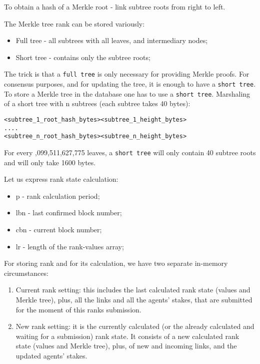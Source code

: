 \documentclass[8pt,oneside]{amsart}
\newcommand{\code}[1]{{\PlayBold #1}}
\begin{document}
\begin{Abstract}
To obtain a hash of a Merkle root - link subtree roots from right to left.

The Merkle tree rank can be stored variously:

\begin{itemize}
\item[] Full tree - all subtrees with all leaves, and intermediary nodes;
\item[] Short tree - contains only the subtree roots;
\end{itemize}

The trick is that a \verb|full tree| is only necessary for providing Merkle proofs. For consensus purposes, and for updating the tree, it is enough to have a \verb|short tree|. To store a Merkle tree in the database one has to use a \verb|short tree|. Marshaling of a short tree with \code{n} subtrees (each subtree takes 40 bytes):

\begin{lstlisting}
<subtree_1_root_hash_bytes><subtree_1_height_bytes>
....
<subtree_n_root_hash_bytes><subtree_n_height_bytes>
\end{lstlisting}

For every \code{1,099,511,627,775} leaves, a \verb|short tree| will only contain 40 subtree roots and will only take 1600 bytes.

Let us express rank state calculation:

\begin{itemize}
    \item[] \code{p} - rank calculation period;
    \item[] \code{lbn} - last confirmed block number;
    \item[] \code{cbn} - current block number;
    \item[] \code{lr} -  length of the rank-values array;
\end{itemize}

For storing rank and for its calculation, we have two separate in-memory circumstances:

\begin{enumerate}
\item Current rank setting: this includes the last calculated rank state (values and Merkle tree), plus,
all the links and all the agents' stakes, that are submitted for the moment of this ranks submission.
\item New rank setting: it is the currently calculated (or the already calculated and waiting for a submission) rank state. It consists of a new calculated rank state (values and Merkle tree), plus, of new and incoming links, and the updated agents' stakes.
\end{enumerate}


\end{Abstract}
\end{document}
